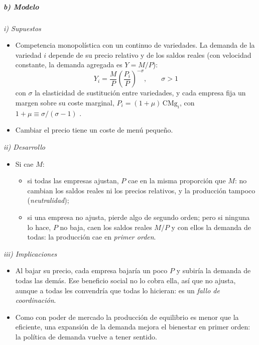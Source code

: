 \documentclass[11pt]{article}
\begin{document}
\subparagraph{b) Modelo}

\hspace*{3.6em}\emph{i) Supuestos}

\begin{itemize}
\item Competencia monopolística con un continuo de variedades. La demanda de la variedad $i$ depende de su precio relativo y de los saldos reales (con velocidad constante, la demanda agregada es $Y=M/P$):
  \begin{equation}
  Y_i=\frac{M}{P}\left(\frac{P_i}{P}\right)^{-\sigma},\qquad \sigma>1 \label{eq:demanda-bk}
  \end{equation}
  con $\sigma$ la elasticidad de sustitución entre variedades, y cada empresa fija un margen sobre su coste marginal, $P_i=(1+\mu)\,\mathrm{CMg}_i$, con $1+\mu\equiv\sigma/(\sigma-1)$ .
\item Cambiar el precio tiene un coste de menú pequeño.
\end{itemize}

\hspace*{3.6em}\emph{ii) Desarrollo}

\begin{itemize}
\item Si cae $M$:
  \begin{itemize}
  \item si todas las empresas ajustan, $P$ cae en la misma proporción que $M$: no cambian los saldos reales ni los precios relativos, y la producción tampoco (\emph{neutralidad});
  \item si una empresa no ajusta, pierde algo de segundo orden; pero si ninguna lo hace, $P$ no baja, caen los saldos reales $M/P$ y con ellos la demanda de todas: la producción cae en \emph{primer orden}.
  \end{itemize}
\end{itemize}

\hspace*{3.6em}\emph{iii) Implicaciones}

\begin{itemize}
\item Al bajar su precio, cada empresa bajaría un poco $P$ y subiría la demanda de todas las demás. Ese beneficio social no lo cobra ella, así que no ajusta, aunque a todas les convendría que todas lo hicieran: es un \emph{fallo de coordinación}.
\item Como con poder de mercado la producción de equilibrio es menor que la eficiente, una expansión de la demanda mejora el bienestar en primer orden: la política de demanda vuelve a tener sentido.
\end{itemize}
\end{document}
